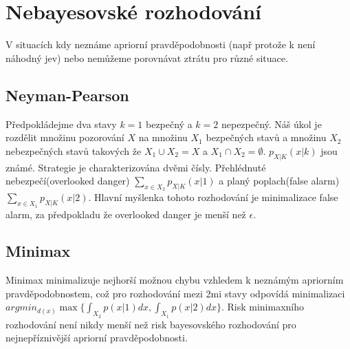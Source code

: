 \documentclass{article}
\begin{document}
\section{Nebayesovské rozhodování}

V situacích kdy neznáme apriorní pravděpodobnosti (např protože k není náhodný jev) nebo nemůžeme porovnávat ztrátu pro různé situace.

\subsection{Neyman-Pearson}

Předpokládejme dva stavy $k = 1$ bezpečný a $k = 2$ nepezpečný. Náš úkol je rozdělit množinu pozorování $X$ na množinu $X_1$ bezpečných stavů a množinu $X_2$ nebezpečných stavů takových že $X_1 \cup X_2 = X$ a $X_1 \cap X_2 = \emptyset$. $p_{X|K}(x|k)$ jsou známé. Strategie je charakterizována dvěmi čísly. Přehlédnuté nebezpečí(overlooked danger) $\displaystyle\sum_{x \in X_2}p_{X|K}(x|1)$ a planý poplach(false alarm) $\displaystyle\sum_{x \in X_1}p_{X|K}(x|2)$. Hlavní myšlenka tohoto rozhodování je minimalizace false alarm, za předpokladu že overlooked danger je menší než $\epsilon$.

\subsection{Minimax}

Minimax minimalizuje nejhorší možnou chybu vzhledem k neznámým apriorním pravděpodobnostem, což pro rozhodování mezi 2mi stavy odpovídá minimalizaci $argmin_{d(x)}\max\{\int_{X_2}p(x|1)dx, \int_{X_1}p(x|2)dx\}$. Risk minimaxního rozhodování není nikdy menší než risk bayesovského rozhodování pro nejnepříznivější apriorní pravděpodobnosti.
\end{document}
